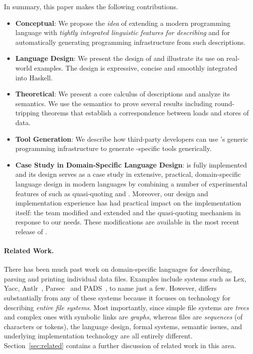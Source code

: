 In summary, this paper makes the following contributions.
\begin{itemize}
\item {\bf Conceptual}:  We propose the {\em idea} 
of extending a modern programming language with
{\em tightly integrated linguistic features for describing \filestores{}}
and for automatically generating programming infrastructure from such 
descriptions.

\item {\bf Language Design}: We present the design of \forest{}
  and illustrate its use on real-world examples.
  The design is expressive, concise and smoothly integrated into
  Haskell.  

\item {\bf Theoretical}: We present a core calculus of \forest{}
descriptions and analyze its semantics.  We use the semantics
to prove several results including round-tripping theorems that
establish a correspondence between loads and stores of \filestore{} data.

\item {\bf Tool Generation}: We describe how third-party developers
  can use \haskell{}'s generic programming infrastructure to generate
  \filestore{}-specific tools generically.

\item {\bf Case Study in Domain-Specific Language Design}: \forest{}
  is fully implemented and its design serves
  as a case study in extensive, practical, domain-specific
  language design in modern languages by combining a number of
  experimental features of \haskell{} such as quasi-quoting and \template{}.
  Moreover, our \forest{} design and implementation experience 
  has had practical impact on the \haskell{} implementation itself:  
  the \haskell{} team modified and extended \template{} and the
  quasi-quoting mechanism in response
  to our needs.  These modifications
  are available in the most recent release of \haskell{}.
\end{itemize}

\paragraph*{Related Work.}
There has been much past work on domain-specific languages for
describing, parsing and printing individual data files. 
Examples include 
systems such as Lex, Yacc,
Antlr~\cite{antlr}, Parsec~\cite{LeijenMeijer:parsec} and 
PADS~\cite{fisher+:toplas}, to name just a few.  
However, \forest{} differs
substantially from any of these systems because it focuses on technology
for describing {\em entire file systems}.  Most importantly, since 
simple file systems are {\em trees} and complex ones with symbolic links are 
{\em graphs}, whereas files are {\em sequences} (of characters or tokens), 
the language design, formal systems,
semantic issues, and underlying implementation 
technology are all entirely different.  Section~\ref{sec:related}
contains a further discussion of related work in this area.

